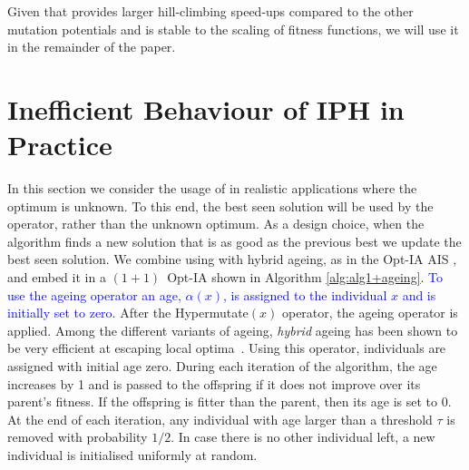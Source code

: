 \documentclass[lettersize,journal]{IEEEtran}
\newcommand{\new}[1]{\textcolor{blue}{#1}}
\begin{document}




Given that {\expoHD } provides larger hill-climbing speed-ups compared to the other mutation potentials and is stable to the scaling of fitness functions,
we will use it in the remainder of the paper.

 	
 	\section{Inefficient Behaviour of IPH in Practice}In this section we consider the usage of  {\expoHD } in realistic applications where the optimum is unknown.
 	To this end, the best seen solution will be used by the operator, rather than the unknown optimum. {\color{blue} As a design choice, when the algorithm finds a new solution that is as good as the previous best we update the best seen solution.}
 	We combine \IPHfcm{} using {\expoHD } with hybrid ageing, as in the Opt-IA AIS \cite{CutelloNicosiaPavoneTimmis2007}, and embed it in a $(1+1)$~Opt-IA shown in Algorithm \ref{alg:alg1+ageing}. \new{To use the ageing operator an age, $\alpha(x)$, is assigned to the individual $x$ and is initially set to zero.} After the Hypermutate$(x)$ operator, %
 	the ageing operator is applied.
 	Among the different variants of ageing, {\it hybrid} ageing has been shown to be very efficient at escaping local optima~\cite{OlivetoSudholt2014ageing,CorusOlivetoYazdaniGECCO2017,CorusOlivetoYazdaniPPSN2018Approx}. Using this operator,  individuals are assigned with initial age zero. During each iteration of the algorithm, the age  increases by 1 and is passed to the offspring if it does not improve over its parent's fitness. If the offspring is fitter than the parent, then its age is set to 0. At the end of each iteration, any individual with age larger than a threshold $\tau$ is removed with probability $1/2$. In case there is no other individual left, a new individual is initialised uniformly at random. 
 
\end{document}
